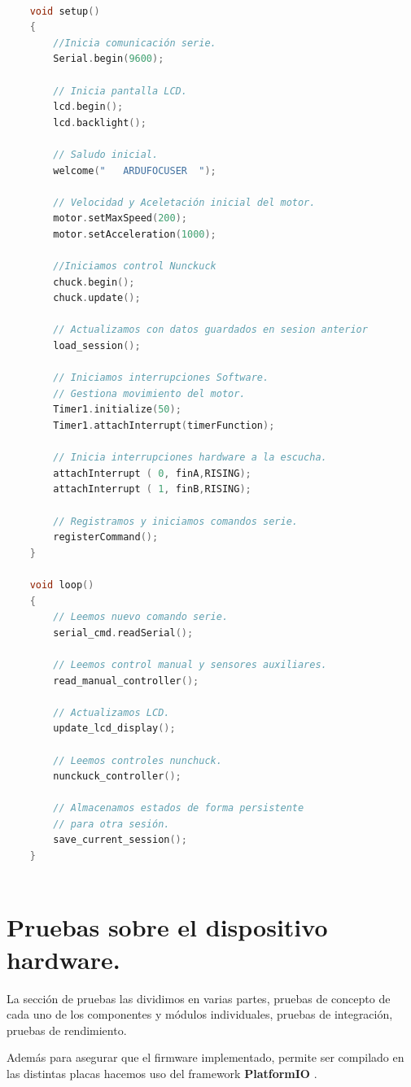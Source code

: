 \begin{lstlisting}[language=C, caption={Núcleo implementación firmware  ardufocuser},label={lst:nucleo_firmware_ardufocuser }]

	void setup()
	{
		//Inicia comunicación serie.
		Serial.begin(9600);
		
		// Inicia pantalla LCD.
		lcd.begin();
		lcd.backlight();
		
		// Saludo inicial.
		welcome("   ARDUFOCUSER  ");
		
		// Velocidad y Aceletación inicial del motor.
		motor.setMaxSpeed(200);
		motor.setAcceleration(1000);
		
		//Iniciamos control Nunckuck
		chuck.begin();
		chuck.update();
		
		// Actualizamos con datos guardados en sesion anterior
		load_session();
		
		// Iniciamos interrupciones Software.
		// Gestiona movimiento del motor.
		Timer1.initialize(50);
		Timer1.attachInterrupt(timerFunction);
		
		// Inicia interrupciones hardware a la escucha.
		attachInterrupt ( 0, finA,RISING);
		attachInterrupt ( 1, finB,RISING);
		
		// Registramos y iniciamos comandos serie.
		registerCommand();
	}
	
	void loop()
	{
		// Leemos nuevo comando serie.
		serial_cmd.readSerial();
		
		// Leemos control manual y sensores auxiliares.
		read_manual_controller();
		
		// Actualizamos LCD.
		update_lcd_display();
		
		// Leemos controles nunchuck.
		nunckuck_controller();
		
		// Almacenamos estados de forma persistente 
		// para otra sesión.
		save_current_session();
	}



\end{lstlisting}



\section{Pruebas sobre el dispositivo hardware.}


La sección de pruebas las dividimos en varias partes, pruebas de concepto de cada uno de los componentes y módulos individuales, pruebas de integración, pruebas de rendimiento. 

Además para asegurar que el firmware implementado, permite ser compilado en las distintas placas hacemos uso del framework   \textbf{PlatformIO} \cite{patform}.





